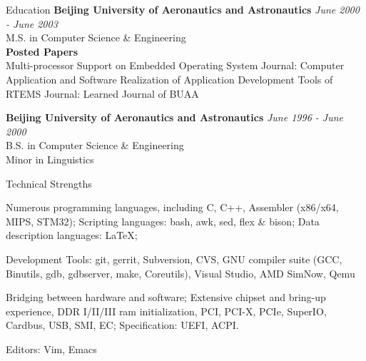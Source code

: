 \documentclass{resume} %
\begin{document}

\begin{rSection}{Education}
{\bf Beijing University of Aeronautics and Astronautics } \hfill {\em June 2000 - June 2003} \\ 
M.S. in Computer Science \& Engineering \\

{\bf Posted Papers }   \\
 Multi-processor Support on Embedded Operating System
                        Journal: Computer Application and Software
 Realization of Application Development Tools of RTEMS
                        Journal: Learned Journal of BUAA


{\bf Beijing University of Aeronautics and Astronautics } \hfill {\em June 1996 - June 2000} \\ 
B.S. in Computer Science \& Engineering \\
Minor in Linguistics \smallskip \\

\end{rSection}




\begin{rSection}{Technical Strengths}

\item Numerous programming languages, including C, C++, Assembler (x86/x64,
  MIPS, STM32); Scripting languages: bash, awk, sed, flex \& bison;
  Data description languages: LaTeX;

\item Development Tools: git, gerrit, Subversion, CVS,
GNU compiler suite (GCC, Binutils, gdb, gdbserver, make, Coreutils), Visual Studio, AMD SimNow, Qemu

\item Bridging between hardware and software; Extensive chipset and bring-up
experience, DDR I/II/III ram initialization, PCI, PCI-X, PCIe, SuperIO, Cardbus, USB,
SMI, EC; Specification: UEFI, ACPI.

\item Editors: Vim, Emacs

\end{rSection}





\end{document}
